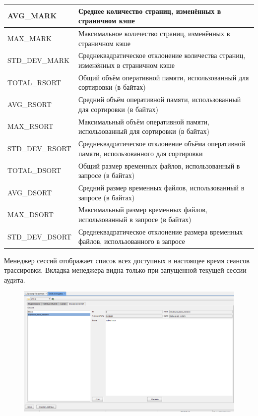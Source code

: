 \begin{longtable}[r]{|>{\ttfamily}m{4.6cm}|m{10.9cm}|}
	AVG\_MARK & Среднее количество страниц, изменённых в страничном кэше\\\hline
	MAX\_MARK & Максимальное количество страниц, изменённых в страничном кэше\\\hline
	STD\_DEV\_MARK & Среднеквадратическое отклонение количества страниц, изменённых в страничном кэше\\\hline
	TOTAL\_RSORT & Общий объём оперативной памяти, использованный для сортировки (в байтах)\\\hline
	AVG\_RSORT & Средний объём оперативной памяти, использованный для сортировки (в байтах)\\\hline
	MAX\_RSORT & Максимальный объём оперативной памяти, использованный для сортировки (в байтах)\\\hline
	STD\_DEV\_RSORT & Среднеквадратическое отклонение объёма оперативной памяти, использованного для сортировки\\\hline
	TOTAL\_DSORT & Общий размер временных файлов, использованный в запросе (в байтах)\\\hline
	AVG\_DSORT & Средний размер временных файлов, использованный в запросе (в байтах)\\\hline
	MAX\_DSORT & Максимальный размер временных файлов, использованный в запросе (в байтах)\\\hline
	STD\_DEV\_DSORT & Среднеквадратическое отклонение размера временных файлов, использованного в запросе\\\hline
\end{longtable}
	
Менеджер сессий отображает список всех доступных в настоящее время сеансов трассировки. Вкладка менеджера видна только при запущенной текущей сессии аудита. 

\begin{figure}[H]
	\centering
	\includegraphics[width = 0.85\linewidth]{img/session_manager.png}
\end{figure}

